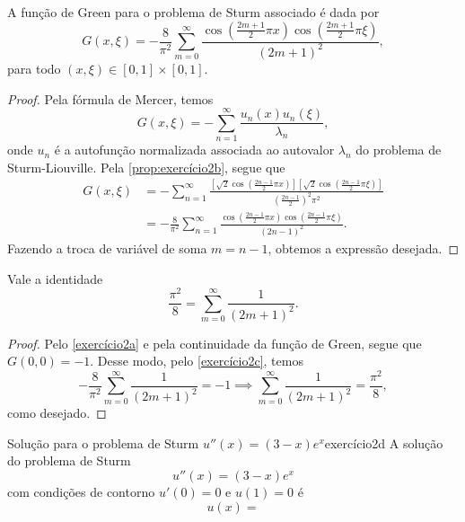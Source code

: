 \begin{corollary}\label{exercício2c}
    A função de Green para o problema de Sturm associado é dada por
    \begin{equation*}
        G(x, \xi) = - \frac{8}{\pi^2}\sum_{m = 0}^{\infty} \frac{\cos\left(\frac{2m + 1}{2}\pi x\right)\cos\left(\frac{2m + 1}{2}\pi \xi\right)}{(2m + 1)^2},
    \end{equation*}
    para todo \((x, \xi) \in [0,1]\times[0,1]\).
\end{corollary}
\begin{proof}
    Pela fórmula de Mercer, temos
    \begin{equation*}
        G(x,\xi) = - \sum_{n = 1}^{\infty} \frac{u_n(x) u_n(\xi)}{\lambda_n},
    \end{equation*}
    onde \(u_n\) é a autofunção normalizada associada ao autovalor \(\lambda_n\) do problema de Sturm-Liouville. Pela \cref{prop:exercício2b}, segue que
    \begin{align*}
        G(x, \xi) &= - \sum_{n = 1}^\infty \frac{\left[\sqrt{2}\cos\left(\frac{2n-1}{2}\pi x\right)\right]\left[\sqrt{2}\cos\left(\frac{2n-1}{2}\pi \xi\right)\right]}{\left(\frac{2n-1}{2}\right)^2\pi^2}\\
                  &= - \frac{8}{\pi^2} \sum_{n = 1}^\infty \frac{\cos\left(\frac{2n-1}{2}\pi x\right)\cos\left(\frac{2n-1}{2}\pi \xi\right)}{(2n-1)^2}.
    \end{align*}
    Fazendo a troca de variável de soma \(m = n - 1\), obtemos a expressão desejada.
\end{proof}
\begin{corollary}
    Vale a identidade
    \begin{equation*}
        \frac{\pi^2}{8} = \sum_{m = 0}^\infty \frac{1}{(2m+1)^2}.
    \end{equation*}
\end{corollary}
\begin{proof}
    Pelo \cref{exercício2a} e pela continuidade da função de Green, segue que \(G(0,0) = -1\). Desse modo, pelo \cref{exercício2c}, temos
    \begin{equation*}
        -\frac{8}{\pi^2} \sum_{m=0}^\infty \frac{1}{(2m+1)^2} = -1\implies
        \sum_{m=0}^\infty \frac{1}{(2m+1)^2} = \frac{\pi^2}{8},
    \end{equation*}
    como desejado.
\end{proof}

\begin{proposition}{Solução para o problema de Sturm \(u''(x) = (3 - x)e^x\)}{exercício2d}
    A solução do problema de Sturm
    \begin{equation*}
        u''(x) = (3-x)e^x
    \end{equation*}
    com condições de contorno \(u'(0) = 0\) e \(u(1) = 0\) é
    \begin{equation*}
        u(x) =
    \end{equation*}
\end{proposition}
